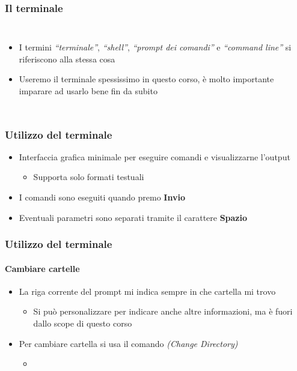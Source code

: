 \begin{contentframe}
    \frametitle{Il terminale}

    \begin{columns}
        \begin{itemize}
            \item I termini \textit{``terminale''}, \textit{``shell''}, \textit{``prompt dei comandi''} e \textit{``command line''} si riferiscono alla stessa cosa

            \bigskip
            \item Useremo il terminale spessissimo in questo corso, è molto importante imparare ad usarlo bene fin da subito
        \end{itemize}

        \centering
    \end{columns}
\end{contentframe}

\begin{contentframe}
    \frametitle{Utilizzo del terminale}

    \begin{itemize}
        \item Interfaccia grafica minimale per eseguire comandi e visualizzarne l'output
        \begin{itemize}
            \item Supporta solo formati testuali
        \end{itemize}

        \bigskip
        \item I comandi sono eseguiti quando premo \textbf{Invio}
        \item Eventuali parametri sono separati tramite il carattere \textbf{Spazio}
    \end{itemize}
\end{contentframe}

\begin{contentframe}
    \frametitle{Utilizzo del terminale}
    \framesubtitle{Cambiare cartelle}

    \begin{itemize}
        \item La riga corrente del prompt mi indica sempre in che cartella mi trovo
        \begin{itemize}
            \item Si può personalizzare per indicare anche altre informazioni, ma è fuori dallo scope di questo corso 
        \end{itemize}
        
        \bigskip
        \item Per cambiare cartella si usa il comando  \textit{(Change Directory)}
        \begin{itemize}
            \item {}
            
        \end{itemize}
    \end{itemize}
\end{contentframe}

